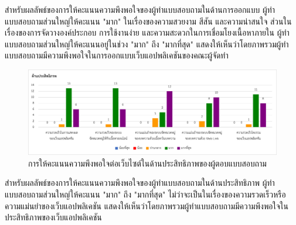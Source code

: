 \documentclass[12pt,oneside,openright,a4paper]{cpe-thai-project}
\begin{document}
\begin{itemize}
\begin{enumerate}
      \hspace{1cm}สำหรับผลลัพธ์ของการให้คะแนนความพึงพอใจของผู้ทำแบบสอบถามในด้านการออกแบบ ผู้ทำแบบสอบถามส่วนใหญ่ให้คะแนน "มาก"
      ในเรื่องของความสวยงาม สีสัน และความน่าสนใจ ส่วนในเรื่องของการจัดวางองค์ประกอบ การใช้งานง่าย และความสะดวกในการเชื่อมโยงเนื้อหาภายใน
      ผู้ทำแบบสอบถามส่วนใหญ่ให้คะแนนอยู่ในช่วง "มาก" ถึง "มากที่สุด" 
      แสดงให้เห็นว่าโดยภาพรวมผู้ทำแบบสอบถามมีความพึงพอใจในการออกแบบเว็บแอปพลิเคชันของคณะผู้จัดทำ
      \newpage
      \begin{figure}[!ht]\centering
        \includegraphics[width=\textwidth]{./img/test/efficient.png}
        \caption{การให้คะแนนความพึงพอใจต่อเว็บไซต์ในด้านประสิทธิภาพของผู้ตอบแบบสอบถาม}\label{fig:user_test_eff}
      \end{figure}

      \hspace{1cm}สำหรับผลลัพธ์ของการให้คะแนนความพึงพอใจของผู้ทำแบบสอบถามในด้านประสิทธิภาพ ผู้ทำแบบสอบถามส่วนใหญ่ให้คะแนน
      "มาก" ถึง "มากที่สุด" ไม่ว่าจะเป็นในเรื่องของความรวดเร็วหรือความแม่นยำของเว็บแอปพลิเคชัน 
      แสดงให้เห็นว่าโดยภาพรวมผู้ทำแบบสอบถามมีความพึงพอใจในประสิทธิภาพของเว็บแอปพลิเคชัน
    

\end{enumerate}
\end{itemize}
\end{document}
